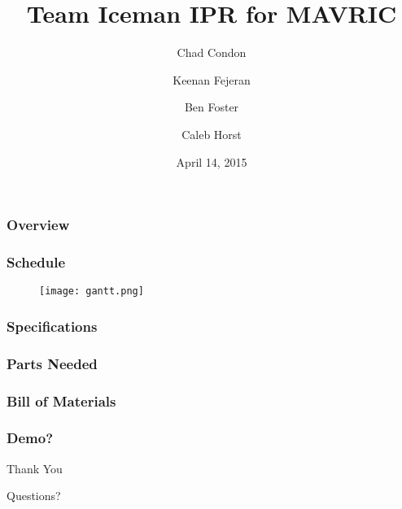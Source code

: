 \documentclass{beamer}
\title[MAVRIC]{Team Iceman IPR for MAVRIC}
\author{
	Chad Condon 
	\and
	Keenan Fejeran 
	\and
	Ben Foster 
	\and
	Caleb Horst 
}
\institute[UWT]{Institute of technology\\University of Washington Tacoma}
\date{April 14, 2015}
\begin{document}
\begin{frame}
	\titlepage
\end{frame}

\begin{frame}
	\frametitle{Overview}
	\tableofcontents
\end{frame}

\begin{frame}
	\frametitle{Schedule}
	\begin{figure}
		\centering
		\texttt{[image: gantt.png]}
	\end{figure}
\end{frame}

\begin{frame}
	\frametitle{Specifications}
\end{frame}

\begin{frame}
	\frametitle{Parts Needed}
\end{frame}

\begin{frame}
	\frametitle{Bill of Materials}
	\begin{table}
		\centering
		
	\end{table}
\end{frame}

\begin{frame}
	\frametitle{Demo?}
\end{frame}

\begin{frame}
	\Huge{\centerline{Thank You} \centerline{Questions?}}
\end{frame}
\end{document}
